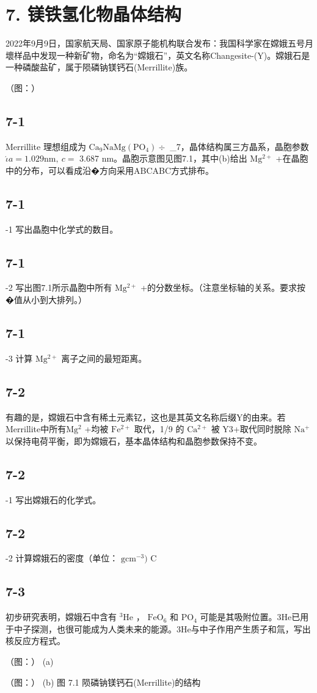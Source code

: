 \section*{7. 镁铁氢化物晶体结构}
2022年9⽉9⽇，国家航天局、国家原⼦能机构联合发布：我国科学家在嫦娥五号⽉壞样品中发现⼀种新矿物，命名为“嫦娥⽯”，英⽂名称Changesite-(Y)。嫦娥⽯是⼀种磷酸盐矿，属于陨磷钠镁钙⽯(Merrillite)族。

（图：）

\subsection*{7-1}
Merrillite 理想组成为 $\mathrm { C a _ { 9 } N a M g ( P O _ { 4 } ) } \div$ _{7}，晶体结构属三⽅晶系，晶胞参数 $\acute { \iota } a = 1 . 0 2 9 \mathrm { n m } , \ c =$ 3.687 nm。晶胞⽰意图⻅图7.1，其中(b)给出 $\mathrm { M g ^ { 2 + } }$ +在晶胞中的分布，可以看成沿�⽅向采⽤ABCABC⽅式排布。

\subsection*{7-1}
-1 写出晶胞中化学式的数⽬。

\subsection*{7-1}
-2 写出图7.1所⽰晶胞中所有 $\mathrm { M g ^ { 2 + } }$ +的分数坐标。（注意坐标轴的关系。要求按�值从⼩到⼤排列。）

\subsection*{7-1}
-3 计算 $\mathrm { M g ^ { 2 + } }$ 离⼦之间的最短距离。

\subsection*{7-2}
有趣的是，嫦娥⽯中含有稀⼟元素钇，这也是其英⽂名称后缀Y的由来。若Merrillite中所有$\mathrm { M g ^ { 2 } }$ +均被 $\mathrm { F e ^ { 2 + } }$ 取代，1/9 的 $\mathrm { { C a ^ { 2 + } } }$ 被 Y3+取代同时脱除 $\mathrm { N a ^ { + } }$ 以保持电荷平衡，即为嫦娥⽯，基本晶体结构和晶胞参数保持不变。

\subsection*{7-2}
-1 写出嫦娥⽯的化学式。

\subsection*{7-2}
-2 计算嫦娥⽯的密度（单位： $\mathrm { g c m ^ { - 3 } } )$ C

\subsection*{7-3}
初步研究表明，嫦娥⽯中含有 $^ { 3 } \mathrm { H e }$ ， $\mathrm { F e O } _ { 6 }$ 和 $\mathrm { P O } _ { 4 }$ 可能是其吸附位置。3He已⽤于中⼦探测，也很可能成为⼈类未来的能源。3He与中⼦作⽤产⽣质⼦和氚，写出核反应⽅程式。

（图：）
(a)

（图：）
(b)
图 7.1 陨磷钠镁钙⽯(Merrillite)的结构
